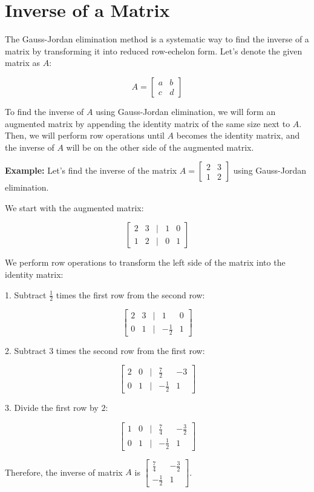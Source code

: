 \section{Inverse of a Matrix}

The Gauss-Jordan elimination method is a systematic way to find the inverse of a matrix by transforming it into reduced row-echelon form. Let's denote the given matrix as $A$:

\[
A = \begin{bmatrix}
    a & b \\
    c & d
\end{bmatrix}
\]

To find the inverse of $A$ using Gauss-Jordan elimination, we will form an augmented matrix by appending the identity matrix of the same size next to $A$. Then, we will perform row operations until $A$ becomes the identity matrix, and the inverse of $A$ will be on the other side of the augmented matrix.

\textbf{Example:} Let's find the inverse of the matrix $A = \begin{bmatrix} 2 & 3 \\ 1 & 2 \end{bmatrix}$ using Gauss-Jordan elimination.

We start with the augmented matrix:

\[
\begin{bmatrix}
    2 & 3 & | & 1 & 0 \\
    1 & 2 & | & 0 & 1
\end{bmatrix}
\]

We perform row operations to transform the left side of the matrix into the identity matrix:

1. Subtract $\frac{1}{2}$ times the first row from the second row:

\[
\begin{bmatrix}
    2 & 3 & | & 1 & 0 \\
    0 & 1 & | & -\frac{1}{2} & 1
\end{bmatrix}
\]

2. Subtract $3$ times the second row from the first row:

\[
\begin{bmatrix}
    2 & 0 & | & \frac{7}{2} & -3 \\
    0 & 1 & | & -\frac{1}{2} & 1
\end{bmatrix}
\]

3. Divide the first row by $2$:

\[
\begin{bmatrix}
    1 & 0 & | & \frac{7}{4} & -\frac{3}{2} \\
    0 & 1 & | & -\frac{1}{2} & 1
\end{bmatrix}
\]

Therefore, the inverse of matrix $A$ is $\begin{bmatrix} \frac{7}{4} & -\frac{3}{2} \\ -\frac{1}{2} & 1 \end{bmatrix}$.
